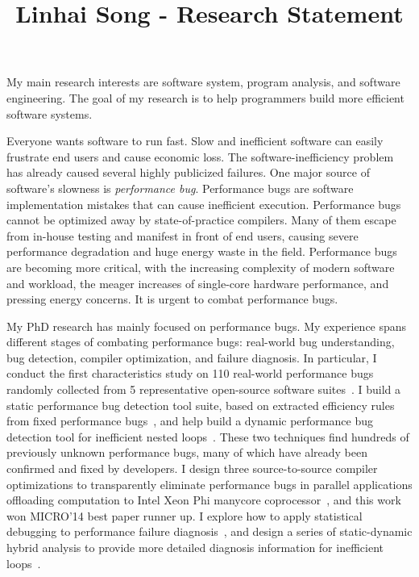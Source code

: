 \documentclass[10pt]{article}
\title{\vspace{-.7in}\bf{Linhai Song - Research Statement\vspace{-.4in}}}
\date{}
\begin{document}
\maketitle\vspace{-.2in}

My main research interests are software system, program analysis, and software engineering. 
The goal of my research is to help programmers build more efficient software systems.

Everyone wants software to run fast. 
Slow and inefficient software can easily frustrate end users and cause economic loss. 
The software-inefficiency problem has already caused several highly publicized failures. 
One major source of software’s slowness is \textit{performance bug}. 
Performance bugs are software implementation mistakes that can cause inefficient execution. 
Performance bugs cannot be optimized away by state-of-practice compilers. 
Many of them escape from in-house testing and manifest in front of end users, causing severe performance degradation and huge energy waste in the field. 
Performance bugs are becoming more critical, with the increasing complexity of modern software and workload, 
the meager increases of single-core hardware performance, 
and pressing energy concerns. 
It is urgent to combat performance bugs.

My PhD research has mainly focused on performance bugs. 
My experience spans different
stages of combating performance bugs: real-world bug understanding, bug detection,
compiler optimization, and failure diagnosis.
In particular, I conduct the first characteristics study on 110 real-world performance bugs 
randomly collected from 5 representative open-source software suites~\cite{jin12perfbug}.
I build a static performance bug detection tool suite, based on extracted efficiency rules from fixed performance bugs~\cite{jin12perfbug}, 
and help build a dynamic performance bug detection tool for inefficient nested loops~\cite{Nistor13ICSE}. 
These two techniques find hundreds of previously unknown performance bugs, many of which have already been confirmed and fixed by developers. 
I design three source-to-source compiler optimizations to transparently eliminate performance bugs in 
parallel applications offloading computation to Intel Xeon Phi manycore coprocessor~\cite{Song14MICRO}, 
and this work won MICRO'14 best paper runner up. 
I explore how to apply statistical debugging to performance failure diagnosis~\cite{Song14OOPSLA}, 
and design a series of static-dynamic hybrid analysis to provide more detailed diagnosis information for inefficient loops~\cite{Song16PLDI}.   
\end{document}
